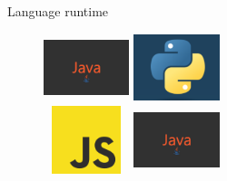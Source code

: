 \documentclass[9pt]{beamer}
\begin{document}

\begin{frame}{Language runtime}
  \begin{figure}
    \centering
    \includegraphics[width=2.5cm,height=2cm]{img/javalogo.jpg}
    \includegraphics[width=2.5cm,height=2cm]{img/pylogo1.png}\\
    \includegraphics[width=2.5cm,height=2cm]{img/jslogo.png}
    \includegraphics[width=2.5cm,height=2cm]{img/javalogo.jpg}
  \end{figure}
  \centering
\end{frame}

\end{document}

